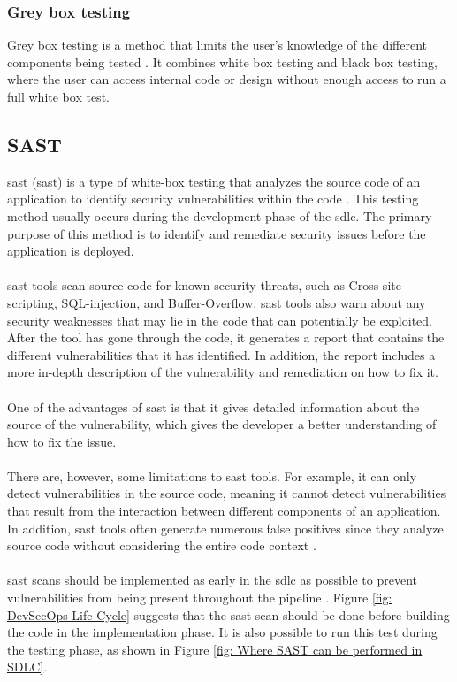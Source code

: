 \subsubsection{Grey box testing}
Grey box testing is a method that limits the user's knowledge of the different components being tested \cite{GreyBox}. It combines white box testing and black box testing, where the user can access internal code or design without enough access to run a full white box test. 

\subsection{SAST}
\acrlong{sast} (\acrshort{sast}) is a type of white-box testing that analyzes the source code of an application to identify security vulnerabilities within the code \cite{sast}. This testing method usually occurs during the development phase of the \acrlong{sdlc}. The primary purpose of this method is to identify and remediate security issues before the application is deployed. 
\\~\\
\acrshort{sast} tools scan source code for known security threats, such as \gls{Cross-site scripting}, \gls{SQL-injection}, and \gls{Buffer-Overflow}. \acrshort{sast} tools also warn about any security weaknesses that may lie in the code that can potentially be exploited. After the tool has gone through the code, it generates a report that contains the different vulnerabilities that it has identified. In addition, the report includes a more in-depth description of the vulnerability and remediation on how to fix it. 
\\~\\
One of the advantages of \acrshort{sast} is that it gives detailed information about the source of the vulnerability, which gives the developer a better understanding of how to fix the issue. 
\\~\\
There are, however, some limitations to \acrshort{sast} tools. For example, it can only detect vulnerabilities in the source code, meaning it cannot detect vulnerabilities that result from the interaction between different components of an application. In addition, \acrshort{sast} tools often generate numerous false positives since they analyze source code without considering the entire code context \cite{SastFalsePositives}.
\\~\\
\acrshort{sast} scans should be implemented as early in the \acrshort{sdlc} as possible to prevent vulnerabilities from being present throughout the \gls{pipeline} \cite{SASTplacement}. Figure \ref{fig: DevSecOps Life Cycle} suggests that the \acrshort{sast} scan should be done before building the code in the implementation phase. It is also possible to run this test during the testing phase, as shown in Figure \ref{fig: Where SAST can be performed in SDLC}.

